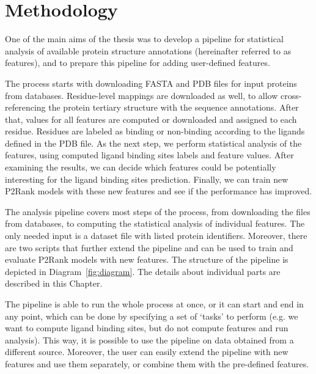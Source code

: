 \chapter{Methodology} \label{ch:3}

One of the main aims of the thesis was to develop a pipeline for statistical analysis of available protein structure annotations (hereinafter referred to as features), and to prepare this pipeline for adding user-defined features.

The process starts with downloading FASTA and PDB files for input proteins from databases. Residue-level mappings are downloaded as well, to allow cross-referencing the protein tertiary structure with the sequence annotations. After that, values for all features are computed or downloaded and assigned to each residue. Residues are labeled as binding or non-binding according to the ligands defined in the PDB file. As the next step, we perform statistical analysis of the features, using computed ligand binding sites labels and feature values. After examining the results, we can decide which features could be potentially interesting for the ligand binding sites prediction. Finally, we can train new P2Rank models with these new features and see if the performance has improved.

The analysis pipeline covers most steps of the process, from downloading the files from databases, to computing the statistical analysis of individual features. The only needed input is a dataset file with listed protein identifiers. Moreover, there are two scripts that further extend the pipeline and can be used to train and evaluate P2Rank models with new features. The structure of the pipeline is depicted in Diagram~\ref{fig:diagram}. The details about individual parts are described in this Chapter.

The pipeline is able to run the whole process at once, or it can start and end in any point, which can be done by specifying a set of `tasks' to perform (e.g. we want to compute ligand binding sites, but do not compute features and run analysis). This way, it is possible to use the pipeline on data obtained from a different source. Moreover, the user can easily extend the pipeline with new features and use them separately, or combine them with the pre-defined features.

